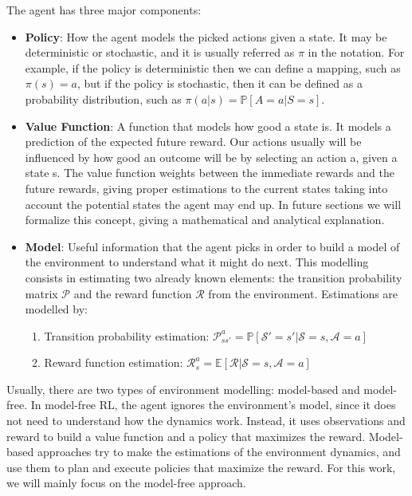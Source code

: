 The agent has three major components:
\begin{itemize}
	\item \textbf{Policy}: How the agent models the picked actions given a state. It may be deterministic or stochastic, and it is usually referred as $\pi$ in the notation. For example, if the policy is deterministic then we can define a mapping, such as $\pi(s)=a$, but if the policy is stochastic, then it can be defined as a probability distribution, such as $\pi(a|s) = \mathbb{P}[A=a|S=s]$.
	\item \textbf{Value Function}: A function that models how good a state is. It models a prediction of the expected future reward. Our actions usually will be influenced by how good an outcome will be by selecting an action a, given a state s. The value function weights between the immediate rewards and the future rewards, giving proper estimations to the current states taking into account the potential states the agent may end up. In future sections we will formalize this concept, giving a mathematical and analytical explanation.
	\item \textbf{Model}: Useful information that the agent picks in order to build a model of the environment to understand what it might do next. This modelling consists in estimating two already known elements: the transition probability matrix $\mathcal{P}$ and the reward function $\mathcal{R}$ from the environment. Estimations are modelled by:
	\begin{enumerate}
		\item Transition probability estimation: $\mathcal{P}_{s s'}^a = \mathbb{P}[\mathcal{S'} = s' | \mathcal{S} = s, \mathcal{A} = a]$ 
		\item Reward function estimation: $\mathcal{R}_{s}^a = \mathbb{E}[\mathcal{R} | \mathcal{S} = s, \mathcal{A} = a]$ 
	\end{enumerate}
\end{itemize}

Usually, there are two types of environment modelling: model-based and model-free. In model-free RL, the agent ignores the environment's model, since it does not need to understand how the dynamics work. Instead, it uses observations and reward to build a value function and a policy that maximizes the reward. Model-based approaches try to make the estimations of the environment dynamics, and use them to plan and execute policies that maximize the reward. For this work, we will mainly focus on the model-free approach.


